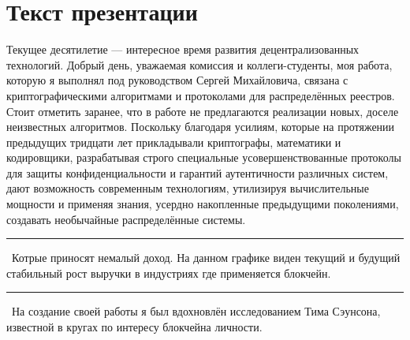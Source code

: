 \documentclass[12pt]{article}
\renewcommand{\line}{\noindent\rule{\textwidth}{1pt}}
\begin{document}
\section*{Текст презентации}
Текущее  десятилетие --- интересное время развития децентрализованных
технологий. Добрый день, уважаемая комиссия и коллеги-студенты, моя работа,
которую я выполнял под руководством Сергей Михайловича, связана с
криптографическими алгоритмами и протоколами для распределённых реестров.
Стоит отметить заранее, что в работе не предлагаются реализации новых, доселе
неизвестных алгоритмов. Поскольку благодаря усилиям,  которые  на  протяжении
предыдущих тридцати  лет  прикладывали криптографы,  математики  и кодировщики,
разрабатывая  строго  специальные усовершенствованные  протоколы для  защиты
конфиденциальности  и гарантий аутентичности  различных  систем, дают
возможность современным технологиям, утилизируя вычислительные мощности и
применяя знания, усердно накопленные предыдущими поколениями, создавать
необычайные распределённые системы.\\
\line\
Котрые приносят немалый доход. На данном графике виден текущий и будущий
стабильный рост выручки в индустриях где применяется блокчейн.\\
\line\
На создание своей работы я был вдохновлён исследованием Тима Сэунсона,
известной в кругах по интересу блокчейна личности. 
\end{document}
